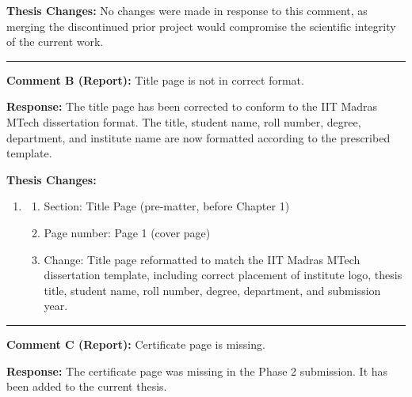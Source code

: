 \documentclass[12pt,a4paper]{article}
\begin{document}
\begin{flushleft}
\textbf{Thesis Changes:} No changes were made in response to this comment, as merging the discontinued prior project would compromise the scientific integrity of the current work.

\vspace{\baselineskip}

\hrule

\vspace{\baselineskip}

\textbf{Comment B (Report):} Title page is not in correct format.

\vspace{\baselineskip}

\textbf{Response:} The title page has been corrected to conform to the IIT Madras MTech dissertation format. The title, student name, roll number, degree, department, and institute name are now formatted according to the prescribed template.

\vspace{\baselineskip}

\textbf{Thesis Changes:}
\begin{enumerate}
    \item
    \begin{enumerate}
        \item Section: Title Page (pre-matter, before Chapter 1)
        \item Page number: Page 1 (cover page)
        \item Change: Title page reformatted to match the IIT Madras MTech dissertation template, including correct placement of institute logo, thesis title, student name, roll number, degree, department, and submission year.
    \end{enumerate}
\end{enumerate}

\vspace{\baselineskip}

\hrule

\vspace{\baselineskip}

\textbf{Comment C (Report):} Certificate page is missing.

\vspace{\baselineskip}

\textbf{Response:} The certificate page was missing in the Phase 2 submission. It has been added to the current thesis.

\vspace{\baselineskip}


\end{flushleft}
\end{document}

